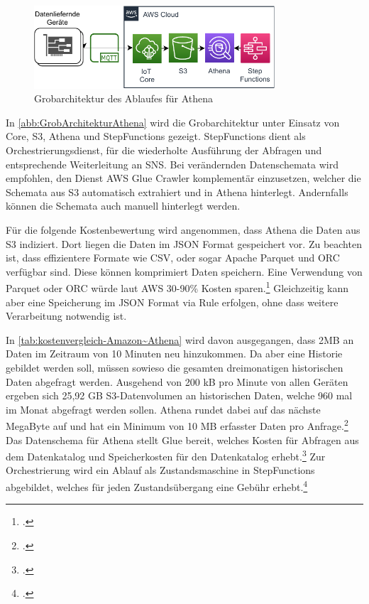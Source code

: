 \begin{figure}[H]
\centering
\includegraphics[width=0.8\textwidth]{graphics/Athena-general.pdf}
\caption{Grobarchitektur des Ablaufes für Athena}
\label{abb:GrobArchitekturAthena}
\end{figure}

In \autoref{abb:GrobArchitekturAthena} wird die Grobarchitektur unter Einsatz von \AWSIOT{} Core, \ac{S3}, Athena und StepFunctions gezeigt. StepFunctions dient als Orchestrierungsdienst, für die wiederholte Ausführung der Abfragen und entsprechende Weiterleitung an \ac{SNS}.
Bei verändernden Datenschemata wird empfohlen, den Dienst \ac{AWS} Glue Crawler komplementär einzusetzen, welcher die Schemata aus \ac{S3} automatisch extrahiert und in Athena hinterlegt. Andernfalls können die Schemata auch manuell hinterlegt werden.


Für die folgende Kostenbewertung wird angenommen, dass Athena die Daten aus \ac{S3} indiziert. Dort liegen die Daten im \ac{JSON} Format gespeichert vor. Zu beachten ist, dass effizientere Formate wie CSV, oder sogar Apache Parquet und ORC verfügbar sind. Diese können komprimiert Daten speichern. Eine Verwendung von Parquet oder ORC würde laut \ac{AWS} 30-90\% Kosten sparen.\footcite[Vgl.][]{AmazonWebServicesInc..o.J.t} Gleichzeitig kann aber eine Speicherung im \ac{JSON} Format via \AWSIOT{} Rule erfolgen, ohne dass weitere Verarbeitung notwendig ist.

In \autoref{tab:kostenvergleich-Amazon~Athena} wird davon ausgegangen, dass 2MB an Daten im Zeitraum von 10 Minuten neu hinzukommen. Da aber eine Historie gebildet werden soll, müssen sowieso die gesamten dreimonatigen historischen Daten abgefragt werden. Ausgehend von 200 kB pro Minute von allen Geräten ergeben sich 25,92 GB \ac{S3}-Datenvolumen an historischen Daten, welche 960 mal im Monat abgefragt werden sollen. Athena rundet dabei auf das nächste MegaByte auf und hat ein Minimum von 10 MB erfasster Daten pro Anfrage.\footcite[Vgl.][]{AmazonWebServicesInc..o.J.t} Das Datenschema für Athena stellt Glue bereit, welches Kosten für Abfragen aus dem Datenkatalog und Speicherkosten für den Datenkatalog erhebt.\footcite[Vgl.][]{AmazonWebServicesInc..o.J.u} Zur Orchestrierung wird ein Ablauf als Zustandsmaschine in StepFunctions abgebildet, welches für jeden Zustandsübergang eine Gebühr erhebt.\footcite[Vgl.][]{AmazonWebServicesInc..o.J.v}

